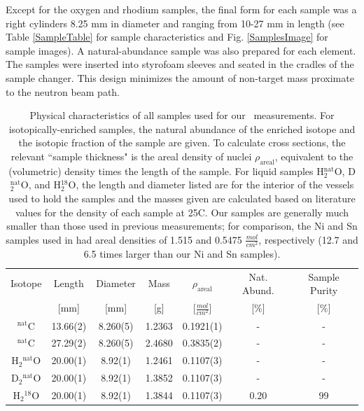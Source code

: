 Except for the oxygen and rhodium samples, the final form for each sample was a right
cylinders 8.25 mm in diameter and ranging from 10-27 mm in length (see
Table \ref{SampleTable} for sample characteristics and Fig. \ref{SamplesImage}
for sample images). A natural-abundance sample
was also prepared for each element. The samples
were inserted into styrofoam sleeves and seated in the cradles of the sample
changer. This design minimizes the amount of non-target mass proximate to the
neutron beam path.

\begin{table}[ht]
    \caption{
        Physical characteristics of all samples used for our \tot\
        measurements. For isotopically-enriched samples, the natural abundance
        of the enriched isotope and the isotopic fraction of the sample are
        given. To calculate cross sections, the relevant ``sample thickness" is the areal
        density of nuclei $\rho_{\text{areal}}$, equivalent to
        the (volumetric) density times the length of the sample. For liquid
        samples H$_{2}^{\text{nat}}$O, D$_{2}^{\text{nat}}$O, and H$_{2}^{18}$O,
        the length and diameter listed are for the interior of the vessels
        used to hold the samples and the masses given are calculated based on 
        literature values for the density of each sample at 25\textdegree{}C.
        Our samples are generally much smaller than those used in previous
        measurements; for comparison, the Ni and Sn samples used in \cite{Abfalterer2001,
        Finlay1993} had areal densities of 1.515 and 0.5475
        $\frac{mol}{cm^{2}}$, respectively (12.7 and 6.5 times larger than our
    Ni and Sn samples).}
    \label{SampleCharacteristics}
    \begin{center}
        \begin{tabular}{ c c c c c c c }
            \hline
            Isotope & Length & Diameter
            & Mass & $\rho_{\text{areal}}$ & Nat. Abund. & Sample Purity\\
                 & [mm] & [mm] & [g] & [$\frac{mol}{cm^{2}}$] & [\%] & [\%]\\
            \hline

            $^{\text{nat}}$C & 13.66(2) & 8.260(5) & 1.2363
            & 0.1921(1) & - & -\\
            $^{\text{nat}}$C & 27.29(2) & 8.260(5) & 2.4680
            & 0.3835(2) & - & -\\

            H$_{2}$$^{\text{nat}}$O & 20.00(1) & 8.92(1) & 1.2461 & 0.1107(3) & - &
            - \\
            D$_{2}$$^{\text{nat}}$O & 20.00(1) & 8.92(1) & 1.3852 & 0.1107(3) & - &
            - \\
            H$_{2}$$^{18}$O & 20.00(1) & 8.92(1) & 1.3844 & 0.1107(3) & 0.20 & 99\\


\end{tabular}
\end{center}
\end{table}
